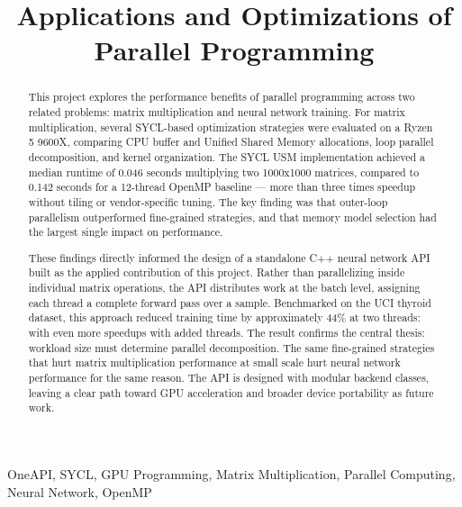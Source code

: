 \documentclass[journal]{IEEEtran}
\begin{document}
\title{Applications and Optimizations of Parallel Programming}

\author{}

\maketitle

\begin{abstract}
\par This project explores the performance benefits of parallel programming across two related problems: matrix multiplication and neural network training. For matrix multiplication, several SYCL-based optimization strategies were evaluated on a Ryzen 5 9600X, comparing CPU buffer and Unified Shared Memory allocations, loop parallel decomposition, and kernel organization. The SYCL USM implementation achieved a median runtime of 0.046 seconds multiplying two 1000x1000 matrices, compared to 0.142 seconds for a 12-thread OpenMP baseline — more than three times speedup without tiling or vendor-specific tuning. The key finding was that outer-loop parallelism outperformed fine-grained strategies, and that memory model selection had the largest single impact on performance.
\par These findings directly informed the design of a standalone C++ neural network API built as the applied contribution of this project. Rather than parallelizing inside individual matrix operations, the API distributes work at the batch level, assigning each thread a complete forward pass over a sample. Benchmarked on the UCI thyroid dataset, this approach reduced training time by approximately 44\% at two threads: with even more speedups with added threads. The result confirms the central thesis: workload size must determine parallel decomposition. The same fine-grained strategies that hurt matrix multiplication performance at small scale hurt neural network performance for the same reason. The API is designed with modular backend classes, leaving a clear path toward GPU acceleration and broader device portability as future work.
\end{abstract}

\begin{IEEEkeywords}
OneAPI, SYCL, GPU Programming, Matrix Multiplication, Parallel Computing, Neural Network, OpenMP
\end{IEEEkeywords}
\end{document}
